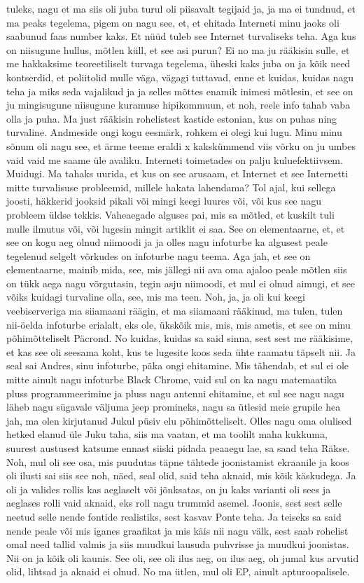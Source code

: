 tuleks, nagu et ma siis oli juba turul oli piisavalt tegijaid ja, ja ma ei tundnud, et ma peaks tegelema, pigem on nagu see, et, et ehitada Interneti minu jaoks oli saabunud faas number kaks. Et nüüd tuleb see Internet turvaliseks teha. Aga kus on niisugune hullus, mõtlen küll, et see asi purun? Ei no ma ju rääkisin sulle, et me hakkaksime teoreetiliselt turvaga tegelema, üheski kaks juba on ja kõik need kontserdid, et poliitolid mulle väga, vägagi tuttavad, enne et kuidas, kuidas nagu teha ja miks seda vajalikud ja ja selles mõttes enamik inimesi mõtlesin, et see on ju mingisugune niisugune kuramuse hipikommuun, et noh, reele info tahab vaba olla ja puha. Ma just rääkisin rohelistest kastide estonian, kus on puhas ning turvaline. Andmeside ongi kogu eesmärk, rohkem ei olegi kui lugu. Minu minu sõnum oli nagu see, et ärme teeme eraldi x kakskümmend viis võrku on ju umbes vaid vaid me saame üle avaliku. Interneti toimetades on palju kuluefektiivsem.
Muidugi.
Ma tahaks uurida, et kus on see arusaam, et Internet et see Internetti mitte turvalisuse probleemid, millele hakata lahendama?
Tol ajal, kui sellega joosti, häkkerid jooksid pikali või mingi keegi luures või, või kus see nagu probleem üldse tekkis.
Vaheaegade alguses pai, mis sa mõtled, et kuskilt tuli mulle ilmutus või, või lugesin mingit artiklit ei saa. See on elementaarne, et, et see on kogu aeg olnud niimoodi ja ja olles nagu infoturbe ka algusest peale tegelenud selgelt võrkudes on infoturbe nagu teema. Aga jah, et see on elementaarne, mainib mida, see, mis jällegi nii ava oma ajaloo peale mõtlen siis on tükk aega nagu võrgutasin, tegin asju niimoodi, et mul ei olnud aimugi, et see võiks kuidagi turvaline olla, see, mis ma teen. Noh, ja, ja oli kui keegi veebiserveriga ma siiamaani räägin, et ma siiamaani rääkinud, ma tulen, tulen nii-öelda infoturbe erialalt, eks ole, ükskõik mis, mis, mis ametis, et see on minu põhimõtteliselt Päcrond. No kuidas, kuidas sa said sinna, sest sest me rääkisime, et kas see oli seesama koht, kus te lugesite koos seda ühte raamatu täpselt nii. Ja seal sai Andres, sinu infoturbe, päka ongi ehitamine. Mis tähendab, et sul ei ole mitte ainult nagu infoturbe Black Chrome, vaid sul on ka nagu matemaatika pluss programmeerimine ja pluss nagu antenni ehitamine, et sul see nagu nagu läheb nagu sügavale väljuma jeep promineks, nagu sa ütlesid meie grupile hea jah, ma olen kirjutanud Jukul püsiv elu põhimõtteliselt.
Olles nagu oma olulised hetked elanud üle Juku taha, siis ma vaatan, et ma toolilt maha kukkuma, suurest austusest katsume ennast siiski pidada peaaegu lae, sa saad teha Räkse. Noh, mul oli see osa, mis puudutas täpne tähtede joonistamist ekraanile ja koos oli ilusti sai siis see noh, näed, seal olid, said teha aknaid, mis kõik käskudega. Ja oli ja valides rollis kas aeglaselt või jõnksatas, on ju kaks varianti oli sees ja aeglases rolli vaid aknaid, eks roll nagu trummid asemel. Joonis, sest sest selle neetud selle nende fontide realistiks, sest kasvav Ponte teha. Ja teiseks sa said nende peale või mis iganes graafikat ja mis käis nii nagu välk, sest saab rohelist omal need tallid valmis ja siis muudkui lausuda puhvrisse ja muudkui joonistas. Nii on ja kõik oli kaunis. See oli, see oli ilus aeg, on ilus aeg, oh jumal kus arvutid olid, lihtsad ja aknaid ei olnud. No ma ütlen, mul oli EP, ainult apturoopalisele.
